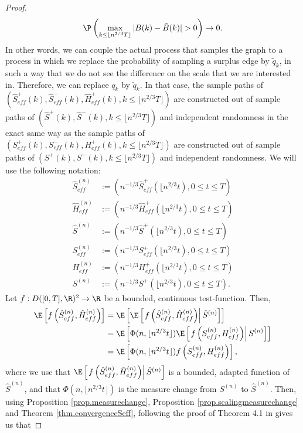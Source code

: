 \begin{proof}
$$\P\left(\max_{k\leq \lfloor n^{2/3} T \rfloor}|B(k)-\tilde{B}(k)|>0\right)\to 0.$$
In other words, we can couple the actual process that samples the graph to a process in which we replace the probability of sampling a surplus edge by $\tilde{q}_k$, in such a way that we do not see the difference on the scale that we are interested in. Therefore, we can replace $q_k$ by $\tilde{q}_k$. In that case, the sample paths of $(\hat{S}^+_{eff}(k),\hat{S}^-_{eff}(k), \hat{H}^+_{eff}(k), k \leq \lfloor n^{2/3}T\rfloor )$ are constructed out of sample paths of $(\hat{S}^+(k),\hat{S}^-(k), k\leq \lfloor n^{2/3}T\rfloor )$ and independent randomness in the exact same way as the sample paths of $({S}^+_{eff}(k),{S}^-_{eff}(k), {H}^+_{eff}(k), k \leq \lfloor n^{2/3}T\rfloor )$ are constructed out of sample paths of $({S}^+(k),{S}^-(k), k\leq \lfloor n^{2/3}T\rfloor )$ and independent randomness. 
We will use the following notation:\begin{align*}
    \hat{S}_{eff}^{(n)}&:=\left(n^{-1/3}\hat{S}^+_{eff}\left(\lfloor n^{2/3} t \right),0\leq t \leq T\right)\\
    \hat{H}_{eff}^{(n)}&:=\left(n^{-1/3}\hat{H}^+_{eff}\left(\lfloor n^{2/3} t \right),0\leq t \leq T\right)\\
    \hat{S}^{(n)}&:=\left(n^{-1/3}\hat{S}^+\left(\lfloor n^{2/3} t \right),0\leq t \leq T\right)\\
     {S}_{eff}^{(n)}&:=\left(n^{-1/3}{S}^+_{eff}\left(\lfloor n^{2/3} t \right),0\leq t \leq T\right)\\
    {H}_{eff}^{(n)}&:=\left(n^{-1/3}{H}^+_{eff}\left(\lfloor n^{2/3} t \right),0\leq t \leq T\right)\\
    {S}^{(n)}&:=\left(n^{-1/3}{S}^+\left(\lfloor n^{2/3} t \right),0\leq t \leq T\right).
\end{align*}
Let $f:D([0,T],\R)^2\to \R$ be a bounded, continuous test-function. Then,
\begin{align*}\E\left[f\left(\hat{S}_{eff}^{(n)},  \hat{H}_{eff}^{(n)}\right) \right]&= \E\left[ \E\left[\left. f\left(\hat{S}_{eff}^{(n)},  \hat{H}_{eff}^{(n)}\right)\right|\hat{S}^{(n)}\right]\right]\\&=\E\left[ \Phi(n,\lfloor n^{2/3} t\rfloor)\E\left[\left.f\left({S}_{eff}^{(n)},  {H}_{eff}^{(n)}\right)\right| {S}^{(n)}\right]\right]\\&=\E\left[ \Phi(n,\lfloor n^{2/3} t\rfloor)f\left({S}_{eff}^{(n)},  {H}_{eff}^{(n)}\right)\right],\end{align*}
where we use that $\E\left[\left. f\left(\hat{S}_{eff}^{(n)},  \hat{H}_{eff}^{(n)}\right)\right|\hat{S}^{(n)}\right]$ is a bounded, adapted function of $\hat{S}^{(n)}$, and that $\Phi(n,\lfloor n^{2/3} t\rfloor)$ is the measure change from ${S}^{(n)}$ to $\hat{S}^{(n)}$. Then, using Proposition \ref{prop.measurechange}, Proposition \ref{prop.scalingmeasurechange} and Theorem \ref{thm.convergenceSeff}, following the proof of Theorem 4.1 in \cite{conchon--kerjanStableGraphMetric2020} gives us that 

\end{proof}
